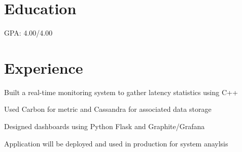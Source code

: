 \documentclass[letterpaper]{deedy-resume} %
\begin{document}
\begin{minipage}[t]{0.66\textwidth} %


\section{Education} 


\vspace{\topsep} %
\begin{tightitemize}
	\item GPA: 4.00/4.00
\end{tightitemize}

\sectionspace %



\section{Experience}


\begin{tightitemize}
\item Built a real-time monitoring system to gather latency statistics using C++
\item Used Carbon for metric and Cassandra for associated data storage
\item Designed dashboards using Python Flask and Graphite/Grafana
\item Application will be deployed and used in production for system anaylsis
\end{tightitemize}

\sectionspace %




\end{minipage}
\end{document}
